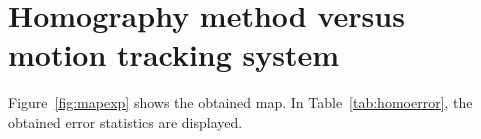 \section{Homography method versus motion tracking system}
\label{sec:exp:homovsopti}

Figure~\ref{fig:mapexp} shows the obtained map. In Table~\ref{tab:homoerror}, the obtained error statistics are displayed.  